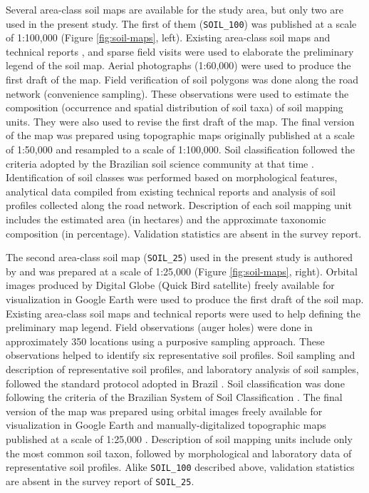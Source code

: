 Several area-class soil maps are available for the study area, but only two are used in the present study. The first of them (\texttt{SOIL\_100}) was published at a scale of 1:100,000 \cite{AzolinEtAl1988} (Figure \ref{fig:soil-maps}, left). Existing area-class soil maps and technical reports \cite{Brasil1973, Azolin1977, MacielEtAl1987a, MacielEtAl1987, AbraoEtAl1988}, and sparse field visits were used to elaborate the preliminary legend of the soil map. Aerial photographs (1:60,000) were used to produce the first draft of the map. Field verification of soil polygons was done along the road network (convenience sampling). These observations were used to estimate the composition (occurrence and spatial distribution of soil taxa) of soil mapping units. They were also used to revise the first draft of the map. The final version of the map was prepared using topographic maps originally published at a scale of 1:50,000 and resampled to a scale of 1:100,000. Soil classification followed the criteria adopted by the Brazilian soil science community at that time \cite{Brasil1973, CamargoEtAl1982, Carvalho1982, LemosEtAl1982, OlmosEtAl1982}. Identification of soil classes was performed based on morphological features, analytical data compiled from existing technical reports and analysis of soil profiles collected along the road network. Description of each soil mapping unit includes the estimated area (in hectares) and the approximate taxonomic composition (in percentage). Validation statistics are absent in the survey report.

The second area-class soil map (\texttt{SOIL\_25}) used in the present study is authored by \cite{Miguel2010} and was prepared at a scale of 1:25,000 (Figure \ref{fig:soil-maps}, right). Orbital images produced by Digital Globe\textregistered{} (Quick Bird satellite) freely available for visualization in Google Earth\textregistered{} were used to produce the first draft of the soil map. Existing area-class soil maps and technical reports \cite{Pedron2005, Poelking2007, Sturmer2008} were used to help defining the preliminary map legend. Field observations (auger holes) were done in approximately 350 locations using a purposive sampling approach. These observations helped to identify six representative soil profiles. Soil sampling and description of representative soil profiles, and laboratory analysis of soil samples, followed the standard protocol adopted in Brazil \cite{ClaessenEtAl1997, SantosEtAl2005}. Soil classification was done following the criteria of the Brazilian System of Soil Classification \cite{SantosEtAl2006}. The final version of the map was prepared using orbital images freely available for visualization in Google Earth\textregistered{} and manually-digitalized topographic maps published at a scale of 1:25,000 \cite{DSG1992a, DSG1992}. Description of soil mapping units include only the most common soil taxon, followed by morphological and laboratory data of representative soil profiles. Alike \texttt{SOIL\_100} described above, validation statistics are absent in the survey report of \texttt{SOIL\_25}.


